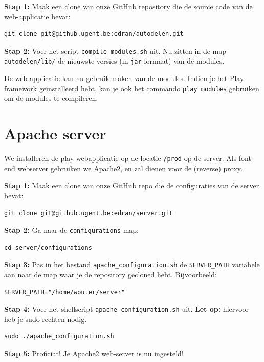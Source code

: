 \documentclass[11pt,a4paper,oneside]{article}
\begin{document}
\textbf{Stap 1:} Maak een clone van onze GitHub repository die de source code van de web-applicatie bevat:
\vspace{-1.7em}\begin{lstlisting}
git clone git@github.ugent.be:edran/autodelen.git
\end{lstlisting}\par
\textbf{Stap 2:} Voer het script \verb|compile_modules.sh| uit. Nu zitten in de map \verb|autodelen/lib/| de nieuwste versies (in \verb|jar|-formaat) van de modules.\par
De web-applicatie kan nu gebruik maken van de modules. Indien je het Play-framework ge\"installeerd hebt, kan je ook het commando \verb|play modules| gebruiken om de modules te compileren.

\section{Apache server}\label{sec:apache}
We installeren de play-webapplicatie op de locatie \verb|/prod| op de server. Als font-end webserver gebruiken we Apache2, en zal dienen voor de (reverse) proxy.\par
\textbf{Stap 1:} Maak een clone van onze GitHub repo die de configuraties van de server bevat:
\vspace{-1.7em}\begin{lstlisting}
git clone git@github.ugent.be:edran/server.git
\end{lstlisting}\par
\textbf{Stap 2:} Ga naar de \verb|configurations| map:
\vspace{-1.7em}\begin{lstlisting}
cd server/configurations
\end{lstlisting}\par
\textbf{Stap 3:} Pas in het bestand \verb|apache_configuration.sh| de \verb$SERVER_PATH$ variabele aan naar de map waar je de repository gecloned hebt. Bijvoorbeeld:
\vspace{-1.7em}\begin{lstlisting}
SERVER_PATH="/home/wouter/server"
\end{lstlisting}\par
\textbf{Stap 4:} Voer het shellscript \verb$apache_configuration.sh$ uit. \textbf{Let op:} hiervoor heb je sudo-rechten nodig.
\vspace{-1.7em}\begin{lstlisting}
sudo ./apache_configuration.sh
\end{lstlisting}\par
\textbf{Stap 5:} Proficiat! Je Apache2 web-server is nu ingesteld!
\end{document}
